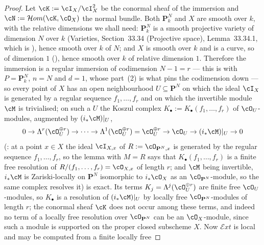 \begin{proof}
Let $\cK:=\cI_X/\cI_X^2$ be the conormal sheaf of the immersion and
$\cN:=\mathcal{H}om(\cK,\cO_X)$ the normal bundle.  Both $\mathbf P^N_k$
and $X$ are smooth over $k$, with the relative dimensions we shall need:
$\mathbf P^N_k$ is a smooth projective variety of dimension $N$ over $k$
(Varieties, Section~33.34 (Projective space), Lemma~33.34.1,
which is ), hence smooth over $k$ of
 $N$;
and $X$ is smooth over $k$ and is a curve, so of dimension $1$
(), hence smooth over $k$ of relative dimension $1$.
Therefore the immersion is a regular immersion of codimension
$N-1=r$ --- this is  with
$P=\mathbf P^N_k$, $n=N$ and $d=1$, whose part~(2) is what pins the
codimension down --- so every point of $X$ has an open neighbourhood
$U\subseteq\mathbf P^N$ on which the ideal $\cI_X$ is generated by a
regular sequence $f_1,\dots,f_r$ and on which the invertible module
$\cM$ is trivialised; on such a $U$ the Koszul complex
$K_\bullet:=K_\bullet(f_1,\dots,f_r)$ of $\cO_U$-modules, augmented
by $(i_*\cM)|_U$,
\[
0\to\Lambda^r(\cO_U^{\oplus r})\to\cdots\to
\Lambda^1(\cO_U^{\oplus r})=\cO_U^{\oplus r}\to\cO_U
\to(i_*\cM)|_U\to0
\]
(: at a point $x\in X$ the ideal
$\cI_{X,x}$ of $R:=\cO_{\mathbf P^N,x}$ is generated by the regular
sequence $f_1,\dots,f_r$, so the lemma with $M=R$ says that
$K_\bullet(f_1,\dots,f_r)$ is a finite free resolution of
$R/(f_1,\dots,f_r)=\cO_{X,x}$ of length $r$; and $\cM$ being
invertible, $i_*\cM$ is Zariski-locally on $\mathbf P^N$ isomorphic
to $i_*\cO_X$ as an $\cO_{\mathbf P^N}$-module, so the same complex
resolves it) is exact.  Its terms
$K_j=\Lambda^j(\cO_U^{\oplus r})$ are finite free $\cO_U$-modules, so
$K_\bullet$ is a resolution of $(i_*\cM)|_U$ by locally free
$\cO_{\mathbf P^N}$-modules of length $r$; the conormal sheaf $\cK$
does not occur among these terms, and indeed no term of a locally
free resolution over $\cO_{\mathbf P^N}$ can be an $\cO_X$-module,
since such a module is supported on the proper closed subscheme $X$.
Now $\mathcal{E}xt$ is local and may be computed from a finite locally free

\end{proof}
